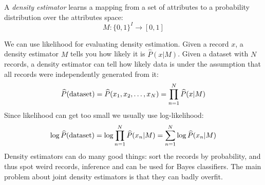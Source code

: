 \documentclass[12pt, a4paper]{report}
\newtheorem[style=M,bodystyle=\normalfont]{theorem}{Theorem}
\newtheorem[style=M,bodystyle=\normalfont]{corollary}{Corollary}
\newtheorem[style=M,bodystyle=\normalfont]{lemma}{Lemma}
\newtheorem[style=M,bodystyle=\normalfont]{definition}{Definition}
\begin{document}
    \begin{definition}
        A \emph{density estimator} learns a mapping from a set of attributes to a probability distribution over the attributes space: 
        \[M:\{0,1\}^I \rightarrow [0,1]\]
    \end{definition}
    We can use likelihood for evaluating density estimation. Given a record $x$, a density estimator $M$ tells you how likely it is $\widehat{P}(x|M)$. Given a dataset with $N$ 
    records, a density estimator can tell how likely data is under the assumption that all records were independently generated from it: 
    \[\widehat{P}(\textnormal{dataset})=\widehat{P}(x_1,x_2,\dots,x_N)=\prod_{n=1}^{N}\widehat{P}(x|M)\]
    Since likelihood can get too small we usually use log-likelihood:
    \[\log{\widehat{P}(\textnormal{dataset})}=\log{\prod_{n=1}^{N}{\widehat{P}(x_n|M)}}=\sum_{n=1}^{N}{\log{\widehat{P}(x_n|M)}}\]
    Density estimators can do many good things: sort the records by probability, and thus spot weird records, inference and can be used for Bayes classifiers. 
    The main problem about joint density estimators is that they can badly overfit. 
\end{document}
